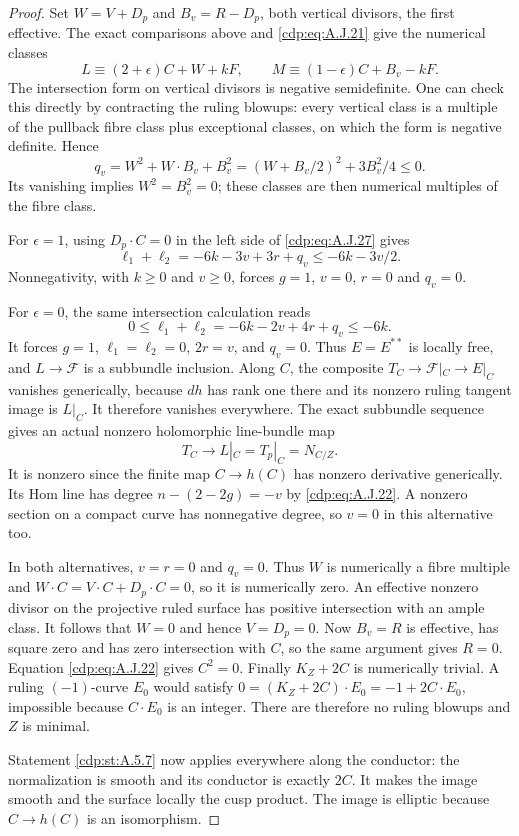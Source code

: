 \begin{proof}
Set $W=V+D_p$ and $B_v=R-D_p$, both vertical
divisors, the first effective. The exact comparisons
above and \eqref{cdp:eq:A.J.21} give the numerical classes
\[
 L\equiv(2+\epsilon)C+W+kF,\qquad
 M\equiv(1-\epsilon)C+B_v-kF.
\]
The intersection form on vertical divisors is negative
semidefinite. One can check this directly by contracting
the ruling blowups: every vertical class is a multiple
of the pullback fibre class plus exceptional classes,
on which the form is negative definite. Hence
\[
 q_v=W^2+W\cdot B_v+B_v^2
      =(W+B_v/2)^2+3B_v^2/4\leq0.
\]
Its vanishing implies $W^2=B_v^2=0$; these classes
are then numerical multiples of the fibre class.

For $\epsilon=1$, using $D_p\cdot C=0$ in the
left side of \eqref{cdp:eq:A.J.27} gives
\[
 \ell_1+\ell_2=-6k-3v+3r+q_v
                  \leq-6k-3v/2.
\]
Nonnegativity, with $k\geq0$ and $v\geq0$,
forces $g=1$, $v=0$, $r=0$ and $q_v=0$.

For $\epsilon=0$, the same intersection calculation reads
\[
 0\leq\ell_1+\ell_2
       =-6k-2v+4r+q_v\leq-6k.                   \tag{A.J.28}\label{cdp:eq:A.J.28}
\]
It forces $g=1$, $\ell_1=\ell_2=0$, $2r=v$,
and $q_v=0$.
Thus $E=E^{**}$ is locally free, and
$L\to\mathcal F$ is a subbundle inclusion.
Along $C$, the composite
$T_C\to\mathcal F|_C\to E|_C$ vanishes generically,
because $dh$ has rank one there and its nonzero ruling
tangent image is $L|_C$. It therefore vanishes
everywhere. The exact subbundle sequence gives an
actual nonzero holomorphic line-bundle map
\[
 T_C\longrightarrow L|_C=T_p|_C=N_{C/Z}.
                                                        \tag{A.J.29}\label{cdp:eq:A.J.29}
\]
It is nonzero since the finite map $C\to h(C)$ has
nonzero derivative generically. Its Hom line has degree
$n-(2-2g)=-v$ by \eqref{cdp:eq:A.J.22}. A nonzero section on a
compact curve has nonnegative degree, so $v=0$ in this
alternative too.

In both alternatives, $v=r=0$ and $q_v=0$.
Thus $W$ is numerically a fibre multiple and
$W\cdot C=V\cdot C+D_p\cdot C=0$, so it is
numerically zero. An effective nonzero divisor on the
projective ruled surface has positive intersection
with an ample class. It follows that $W=0$ and hence
$V=D_p=0$. Now $B_v=R$ is effective, has square zero
and has zero intersection with $C$, so the same
argument gives $R=0$. Equation \eqref{cdp:eq:A.J.22} gives $C^2=0$.
Finally $K_Z+2C$ is numerically trivial. A ruling
$(-1)$-curve $E_0$ would satisfy
$0=(K_Z+2C)\cdot E_0=-1+2C\cdot E_0$, impossible
because $C\cdot E_0$ is an integer. There are therefore
no ruling blowups and $Z$ is minimal.

Statement \ref{cdp:st:A.5.7} now applies everywhere along
the conductor: the normalization is smooth and its
conductor is exactly $2C$. It makes the image smooth
and the surface locally the cusp product. The image is
elliptic because $C\to h(C)$ is an isomorphism.
\end{proof}


